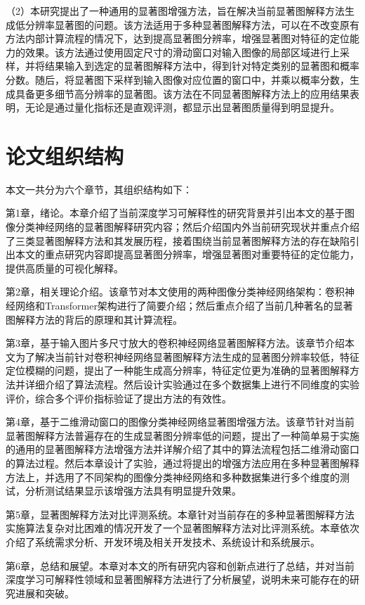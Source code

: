 （2）本研究提出了一种通用的显著图增强方法，旨在解决当前显著图解释方法生成低分辨率显著图的问题。该方法适用于多种显著图解释方法，可以在不改变原有方法内部计算流程的情况下，达到提高显著图分辨率，增强显著图对特征的定位能力的效果。该方法通过使用固定尺寸的滑动窗口对输入图像的局部区域进行上采样，并将结果输入到选定的显著图解释方法中，得到针对特定类别的显著图和概率分数。随后，将显著图下采样到输入图像对应位置的窗口中，并乘以概率分数，生成具备更多细节高分辨率的显著图。该方法在不同显著图解释方法上的应用结果表明，无论是通过量化指标还是直观评测，都显示出显著图质量得到明显提升。

\section{论文组织结构} 
本文一共分为六个章节，其组织结构如下：

第1章，绪论。本章介绍了当前深度学习可解释性的研究背景并引出本文的基于图像分类神经网络的显著图解释研究内容；然后介绍国内外当前研究现状并重点介绍了三类显著图解释方法和其发展历程，接着围绕当前显著图解释方法的存在缺陷引出本文的重点研究内容即提高显著图分辨率，增强显著图对重要特征的定位能力，提供高质量的可视化解释。

第2章，相关理论介绍。该章节对本文使用的两种图像分类神经网络架构：卷积神经网络和Transformer架构进行了简要介绍；然后重点介绍了当前几种著名的显著图解释方法的背后的原理和其计算流程。

第3章，基于输入图片多尺寸放大的卷积神经网络显著图解释方法。该章节介绍本文为了解决当前针对卷积神经网络显著图解释方法生成的显著图分辨率较低，特征定位模糊的问题，提出了一种能生成高分辨率，特征定位更为准确的显著图解释方法并详细介绍了算法流程。然后设计实验通过在多个数据集上进行不同维度的实验评价，综合多个评价指标验证了提出方法的有效性。

第4章，基于二维滑动窗口的图像分类神经网络显著图增强方法。该章节针对当前显著图解释方法普遍存在的生成显著图分辨率低的问题，提出了一种简单易于实施的通用的显著图解释方法增强方法并详解介绍了其中的算法流程包括二维滑动窗口的算法过程。然后本章设计了实验，通过将提出的增强方法应用在多种显著图解释方法上，并选用了不同架构的图像分类神经网络和多种数据集进行多个维度的测试，分析测试结果显示该增强方法具有明显提升效果。

第5章，显著图解释方法对比评测系统。本章针对当前存在的多种显著图解释方法实施算法复杂对比困难的情况开发了一个显著图解释方法对比评测系统。本章依次介绍了系统需求分析、开发环境及相关开发技术、系统设计和系统展示。

第6章，总结和展望。本章对本文的所有研究内容和创新点进行了总结，并对当前深度学习可解释性领域和显著图解释方法进行了分析展望，说明未来可能存在的研究进展和突破。



\clearpage